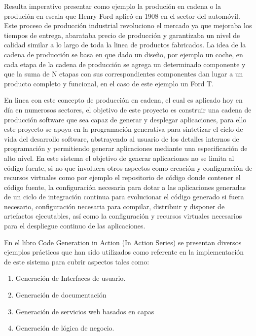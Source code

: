 \documentclass[a4paper,11pt]{book}
\begin{document}
Resulta imperativo presentar como ejemplo  la produción en cadena o la produción en escala que Henry Ford aplicó en 1908 en el sector del automóvil. Este proceso de producción industrial revoluciono el mercado ya que mejoraba los tiempos de entrega, abarataba precio de producción y garantizaba un nivel de calidad similar a lo largo de toda la linea de productos fabricados. La idea de la cadena de producción se basa en que dado un diseño, por ejemplo un coche, en cada etapa de la cadena de producción  se agrega un determinado componente y que la suma de N etapas con sus correspondientes componentes dan lugar a un producto completo y funcional, en el caso de este ejemplo un Ford T. 

En linea con este concepto de producción en cadena, el cual es aplicado hoy en día en numerosos sectores, el objetivo de este proyecto es construir una cadena de producción software que sea capaz de generar y desplegar aplicaciones, para ello este proyecto se apoya en la programación generativa para sintetizar el ciclo de vida del desarrollo software, abstrayendo al usuario de los detalles internos de programación y permitiendo generar aplicaciones mediante una especificación de alto nivel. En este sistema el objetivo  de generar aplicaciones no se limita al código fuente, si no que involucra otros aspectos como creación y configuración de recursos virtuales como por ejemplo el repositorio de código donde contener el código fuente, la configuración necesaria para dotar a las aplicaciones generadas de un ciclo de integración continua para evolucionar el código generado si fuera necesario, configuración necesaria para compilar, distribuir y disponer de artefactos ejecutables, así como  la configuración y recursos virtuales necesarios para el despliegue continuo de las aplicaciones.
 
En el libro Code Generation in Action (In Action Series)\cite{codeg} se presentan diversos ejemplos prácticos que han sido utilizados como referente en la implementación de este sistema para cubrir aspectos tales como:

\begin{enumerate}
\item Generación de Interfaces de usuario. 
\item Generación de documentación
\item Generación de servicios web basados en capas
\item Generación de lógica de negocio. 
\end{enumerate}
\end{document}
